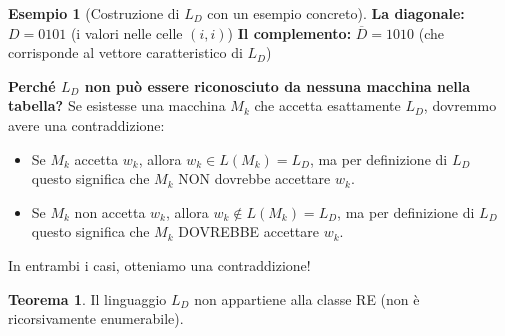 \documentclass[a4paper]{article}
\theoremstyle{definition} %
\newtheorem{theorem}{Teorema}
\newtheorem{example}{Esempio}
\theoremstyle{remark} %
\begin{document}
\begin{example}[Costruzione di $L_D$ con un esempio concreto]
\textbf{La diagonale:} $D = 0101$ (i valori nelle celle $(i,i)$)
\textbf{Il complemento:} $\overline{D} = 1010$ (che corrisponde al vettore caratteristico di $L_D$)

\textbf{Perché $L_D$ non può essere riconosciuto da nessuna macchina nella tabella?}
Se esistesse una macchina $M_k$ che accetta esattamente $L_D$, dovremmo avere una contraddizione:
\begin{itemize}
    \item Se $M_k$ accetta $w_k$, allora $w_k \in L(M_k) = L_D$, ma per definizione di $L_D$ questo significa che $M_k$ NON dovrebbe accettare $w_k$.
    \item Se $M_k$ non accetta $w_k$, allora $w_k \notin L(M_k) = L_D$, ma per definizione di $L_D$ questo significa che $M_k$ DOVREBBE accettare $w_k$.
\end{itemize}
In entrambi i casi, otteniamo una contraddizione!
\end{example}

\begin{theorem}
Il linguaggio $L_D$ non appartiene alla classe RE (non è ricorsivamente enumerabile).
\end{theorem}
\end{document}
